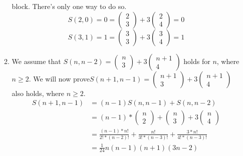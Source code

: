 \documentclass[UTF8]{article}
\begin{document}
\begin{enumerate}[(a)]
\begin{enumerate}[1]
            block. There’s only one way to do so. 
            $$ S(2 , 0) = 0 = \begin{pmatrix} 2 \\ 3 \end{pmatrix} + 3 \begin{pmatrix} 2 \\ 4 \end{pmatrix} = 0 $$
            $$ S(3 , 1) = 1 = \begin{pmatrix} 3 \\ 3 \end{pmatrix} + 3 \begin{pmatrix} 3 \\ 4 \end{pmatrix} = 1 $$
            \item We assume that $S(n , n - 2) = \begin{pmatrix} n \\ 3 \end{pmatrix} + 3 \begin{pmatrix} n + 1 \\ 4 \end{pmatrix}$ holds for $n$, where $n \geq 2$. We will
            now prove$ S(n + 1, n - 1) = \begin{pmatrix} n + 1 \\ 3 \end{pmatrix} + 3 \begin{pmatrix} n + 1 \\ 4 \end{pmatrix} $also holds, where $n \geq 2$. 
                \begin{equation}
                    \begin{aligned}
                    S(n + 1, n - 1) &= (n - 1)S(n,n - 1) + S(n,n - 2) \\
                    &= (n - 1) * \begin{pmatrix} n \\ 2 \end{pmatrix} + \begin{pmatrix} n \\ 3 \end{pmatrix} + 3\begin{pmatrix} n \\ 4 \end{pmatrix}\\
                    &= \frac{(n - 1) * n!}{2! * (n - 2)!} + \frac{n!}{3! * (n - 3)!} + \frac{3 * n!}{4! * (n - 3)!} \\
                    &= \frac{1}{24}n(n - 1)(n + 1)(3n - 2)

\end{aligned}
\end{equation}
\end{enumerate}
\end{enumerate}
\end{document}
